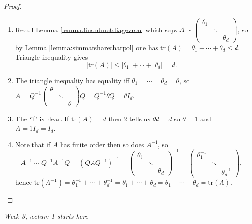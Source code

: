 \documentclass[a4paper]{article}
\newcommand{\tr}{\text{tr}}
\theoremstyle{definition}
\begin{document}
\begin{proof}
\begin{enumerate}
\item Recall Lemma \ref{lemma:finordmatdiagevrou} which says $A\sim \begin{pmatrix}\theta_1 & & \\& \ddots \\& & \theta_d\end{pmatrix}$, so by Lemma \ref{lemma:simmatsharecharpol} one has $\tr(A)=\theta_1+\cdots+\theta_d\leq d$. Triangle inequality gives
\[
|\tr(A)|\leq |\theta_1|+\cdots+|\theta_d|=d.
\]
\item The triangle inequality has equality iff $\theta_1=\cdots=\theta_d=\theta$, so $A=Q^{-1}\begin{pmatrix}
\theta & & \\
& \ddots \\
 & & \theta
\end{pmatrix}Q=Q^{-1}\theta Q=\theta I_d$.
\item The `if' is clear. If $\tr(A)=d$ then 2 tells us $\theta d=d$ so $\theta=1$ and $A=1I_d=I_d$.
\item Note that if $A$ has finite order then so does $A^{-1}$, so
\[
A^{-1}\sim Q^{-1}A^{-1}Q=\left(QAQ^{-1}\right)^{-1}=\begin{pmatrix}\theta_1 & & \\& \ddots \\& & \theta_d\end{pmatrix}^{-1}=\begin{pmatrix}\theta_1^{-1} & & \\& \ddots \\& & \theta_d^{-1}\end{pmatrix},
\]
hence $\tr\left(A^{-1}\right)=\theta_1^{-1}+\cdots+\theta_d^{-1}=\overline{\theta_1}+\cdots+\overline{\theta_d}=\overline{\theta_1+\cdots+\theta_d}=\tr(A)$.
\end{enumerate}
\end{proof}

\begin{flushright}
\textit{Week 3, lecture 1 starts here}
\end{flushright}
\end{document}
